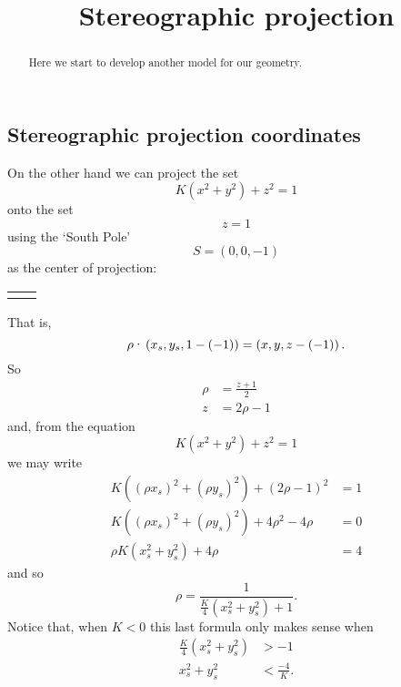 \documentclass{ximera}
\title{Stereographic projection}
\begin{document}
\begin{abstract}
Here we start to develop another model for our geometry.
\end{abstract}
\maketitle


\subsection*{Stereographic projection coordinates}

On the other hand we can project the set
\[
K\left(  x^{2}+y^{2}\right)  +z^{2}=1
\]
onto the set%
\[
z=1
\]
using the `South Pole'%
\[
S=\left(  0,0,-1\right)
\]
as the center of projection:%

\begin{tabular}
[c]{cc}%
{\includegraphics[
natheight=3.406500in,
natwidth=4.912100in,
height=1.9389in,
width=2.789in
]%
{MXAJBZ0M.jpg}%
}%
&
{\includegraphics[
natheight=4.263500in,
natwidth=4.889600in,
height=1.9415in,
width=2.226in
]%
{MXAJBZ0N.jpg}%
}%
\end{tabular}


That is,%
\[
\rho\text{\textperiodcentered}\left(  x_{s},y_{s},1-\left(  -1\right)
\right)  =\left(  x,y,z-\left(  -1\right)  \right)  .
\]
So%
\begin{align*}
\rho &  =\frac{z+1}{2}\\
z  &  =2\rho-1
\end{align*}
and, from the equation
\[
K\left(  x^{2}+y^{2}\right)  +z^{2}=1%
\]
we may write
\begin{align*}
K\left((\rho x_{s})^{2}+(\rho y_{s})^{2}\right)+(2\rho-1)^{2} &=1\\
K\left((\rho x_{s})^{2}+(\rho y_{s})^{2}\right)+4\rho^{2}-4\rho &=0\\
\rho K\left(x_{s}^{2}+y_{s}^{2}\right)+4\rho &=4
\end{align*}
and so
\[
\rho=\frac{1}{\frac{K}{4}\left(  x_{s}^{2}+y_{s}^{2}\right)  +1}.
\]
Notice that, when $K<0$ this last formula only makes sense when%
\begin{align*}
\frac{K}{4}\left(  x_{s}^{2}+y_{s}^{2}\right)  &> -1\\
x_{s}^{2}+y_{s}^{2} &<\frac{-4}{K}.
\end{align*}
\end{document}
